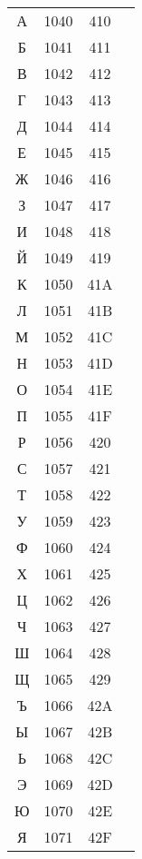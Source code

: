 \documentclass[10pt]{article}
\begin{document}
\begin{tabular}{crcl}
А&1040&410&\\
Б&1041&411&\\
В&1042&412&\\
Г&1043&413&\\
Д&1044&414&\\
Е&1045&415&\\
Ж&1046&416&\\
З&1047&417&\\
И&1048&418&\\
Й&1049&419&\\
К&1050&41A&\\
Л&1051&41B&\\
М&1052&41C&\\
Н&1053&41D&\\
О&1054&41E&\\
П&1055&41F&\\
Р&1056&420&\\
С&1057&421&\\
Т&1058&422&\\
У&1059&423&\\
Ф&1060&424&\\
Х&1061&425&\\
Ц&1062&426&\\
Ч&1063&427&\\
Ш&1064&428&\\
Щ&1065&429&\\
Ъ&1066&42A&\\
Ы&1067&42B&\\
Ь&1068&42C&\\
Э&1069&42D&\\
Ю&1070&42E&\\
Я&1071&42F&\\
\end{tabular}
\end{document}
